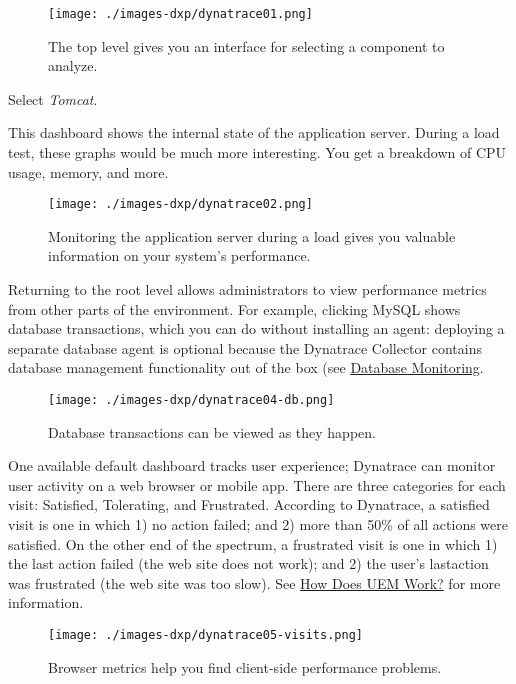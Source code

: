 \begin{figure}
\centering
\texttt{[image: ./images-dxp/dynatrace01.png]}
\caption{The top level gives you an interface for selecting a component
to analyze.}
\end{figure}

Select \emph{Tomcat}.

This dashboard shows the internal state of the application server.
During a load test, these graphs would be much more interesting. You get
a breakdown of CPU usage, memory, and more.

\begin{figure}
\centering
\texttt{[image: ./images-dxp/dynatrace02.png]}
\caption{Monitoring the application server during a load gives you
valuable information on your system's performance.}
\end{figure}

Returning to the root level allows administrators to view performance
metrics from other parts of the environment. For example, clicking MySQL
shows database transactions, which you can do without installing an
agent: deploying a separate database agent is optional because the
Dynatrace Collector contains database management functionality out of
the box (see
\href{https://community.dynatrace.com/community/display/DOCDT65/Database+Monitoring}{Database
Monitoring}.

\begin{figure}
\centering
\texttt{[image: ./images-dxp/dynatrace04-db.png]}
\caption{Database transactions can be viewed as they happen.}
\end{figure}

One available default dashboard tracks user experience; Dynatrace can
monitor user activity on a web browser or mobile app. There are three
categories for each visit: Satisfied, Tolerating, and Frustrated.
According to Dynatrace, a satisfied visit is one in which 1) no action
failed; and 2) more than 50\% of all actions were satisfied. On the
other end of the spectrum, a frustrated visit is one in which 1) the
last action failed (the web site does not work); and 2) the user's
lastaction was frustrated (the web site was too slow). See
\href{https://community.dynatrace.com/community/pages/viewpage.action?pageId=221381305\#HowDoesUEMWork}{How
Does UEM Work?} for more information.

\begin{figure}
\centering
\texttt{[image: ./images-dxp/dynatrace05-visits.png]}
\caption{Browser metrics help you find client-side performance
problems.}
\end{figure}


